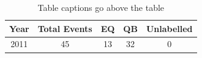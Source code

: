 \begin{table}
    \centering
    \caption[Short caption for ToT]{Table captions go above the table}
    \begin{tabular}{c|c|c|c|c}
        Year & Total Events & EQ & QB & Unlabelled \\
        \hline
        2011 & 45 & 13 & 32 & 0 \\
    \end{tabular}
    \label{tab:study_period_events}
\end{table}



